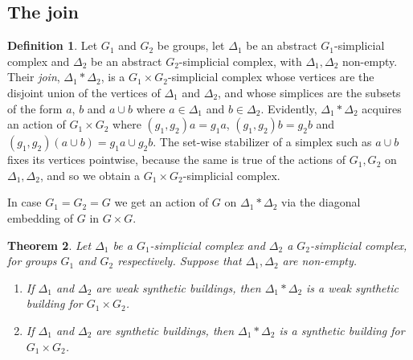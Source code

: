 \documentclass[12pt]{amsart}
\theoremstyle{plain}
\newtheorem{theorem}{Theorem}[section]
\theoremstyle{definition}
\newtheorem{definition}[theorem]{Definition}
\theoremstyle{remark}
\numberwithin{equation}{section}
\begin{document}
\subsection{The join}
\begin{definition}
Let $G_1$ and $G_2$ be groups, let $\Delta_1$ be an abstract $G_1$-simplicial complex and $\Delta_2$ be an abstract $G_2$-simplicial complex, with $\Delta_1,\Delta_2$ non-empty. Their \textit{join}, $\Delta_1*\Delta_2$, is a $G_1\times G_2$-simplicial complex whose vertices are the disjoint union of the vertices of $\Delta_1$ and $\Delta_2$, and whose simplices are the subsets of the form $a$, $b$ and $a\cup b$  where $a\in\Delta_1$ and $b\in\Delta_2$. Evidently, $\Delta_1*\Delta_2$ acquires an action of $G_1\times G_2$ where $(g_1,g_2)a=g_1a$, $(g_1,g_2)b=g_2b$ and $(g_1,g_2)(a\cup b)=g_1a\cup g_2b$. The set-wise stabilizer of a simplex such as $a\cup b$ fixes its vertices pointwise, because the same is true of the actions of $G_1,G_2$ on $\Delta_1,\Delta_2$, and so we obtain a $G_1\times G_2$-simplicial complex.
\end{definition}
In case $G_1=G_2=G$ we get an action of $G$ on $\Delta_1*\Delta_2$ via the diagonal embedding of $G$ in $G\times G$.
\begin{theorem}
    Let $\Delta_1$ be a $G_1$-simplicial complex and $\Delta_2$ a $G_2$-simplicial complex, for groups $G_1$ and $G_2$ respectively. Suppose that $\Delta_1,\Delta_2$ are non-empty.
    \begin{enumerate}
        \item If $\Delta_1$ and $\Delta_2$ are weak synthetic buildings, then $\Delta_1*\Delta_2$ is a weak synthetic building for $G_1\times G_2$.
        \item If $\Delta_1$ and $\Delta_2$ are synthetic buildings, then $\Delta_1*\Delta_2$ is a synthetic building for $G_1\times G_2$. 
    
    \end{enumerate}
    
\end{theorem}
\end{document}
